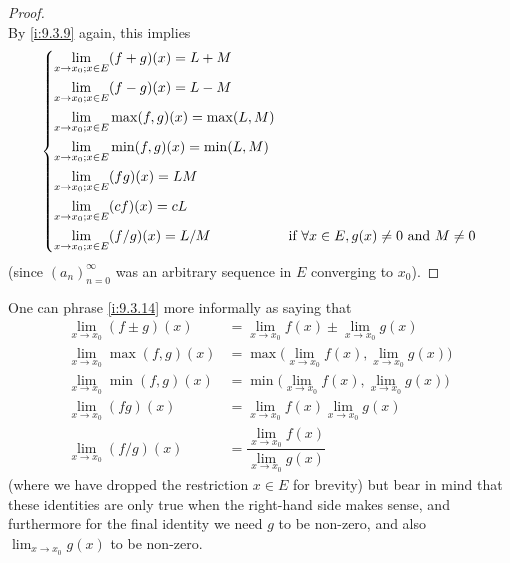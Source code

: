 \begin{proof}
\[  \]
  By \cref{i:9.3.9} again, this implies
  \[
    \begin{dcases}
      \lim_{x \to x_0 ; x \in E} (f + g)(x) = L + M                                                                 \\
      \lim_{x \to x_0 ; x \in E} (f - g)(x) = L - M                                                                 \\
      \lim_{x \to x_0 ; x \in E} \max(f, g)(x) = \max(L, M)                                                         \\
      \lim_{x \to x_0 ; x \in E} \min(f, g)(x) = \min(L, M)                                                         \\
      \lim_{x \to x_0 ; x \in E} (fg)(x) = LM                                                                       \\
      \lim_{x \to x_0 ; x \in E} (cf)(x) = cL                                                                       \\
      \lim_{x \to x_0 ; x \in E} (f / g)(x) = L / M & \text{if } \forall x \in E, g(x) \neq 0 \text{ and } M \neq 0
    \end{dcases}
  \]
  (since \((a_n)_{n = 0}^\infty\) was an arbitrary sequence in \(E\) converging to \(x_0\)).
\end{proof}

\begin{rmk}\label{i:9.3.15}
  One can phrase \cref{i:9.3.14} more informally as saying that
  \begin{align*}
    \lim_{x \to x_0} (f \pm g)(x)  & = \lim_{x \to x_0} f(x) \pm \lim_{x \to x_0} g(x)              \\
    \lim_{x \to x_0} \max(f, g)(x) & = \max\bigg(\lim_{x \to x_0} f(x), \lim_{x \to x_0} g(x)\bigg) \\
    \lim_{x \to x_0} \min(f, g)(x) & = \min\bigg(\lim_{x \to x_0} f(x), \lim_{x \to x_0} g(x)\bigg) \\
    \lim_{x \to x_0} (fg)(x)       & = \lim_{x \to x_0} f(x) \lim_{x \to x_0} g(x)                  \\
    \lim_{x \to x_0} (f / g)(x)    & = \dfrac{\lim_{x \to x_0} f(x)}{\lim_{x \to x_0} g(x)}
  \end{align*}
  (where we have dropped the restriction \(x \in E\) for brevity)
  but bear in mind that these identities are only true when the right-hand side makes sense, and furthermore for the final identity we need \(g\) to be non-zero, and also \(\lim_{x \to x_0} g(x)\) to be non-zero.
\end{rmk}

